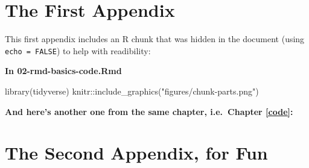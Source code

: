 \documentclass[a4paper, twoside]{templates/ociamthesis}
\newenvironment{Shaded}{\begin{snugshade}}{\end{snugshade}}
\newcommand{\FunctionTok}[1]{\textcolor[rgb]{0.00,0.00,0.00}{#1}}
\newcommand{\NormalTok}[1]{#1}
\newcommand{\SpecialCharTok}[1]{\textcolor[rgb]{0.00,0.00,0.00}{#1}}
\newcommand{\StringTok}[1]{\textcolor[rgb]{0.31,0.60,0.02}{#1}}
\renewenvironment{Shaded}
{
  \vspace{4pt}%
  \begin{snugshade}%
}{%
  \end{snugshade}%
  \vspace{4pt}%
}
\newcommand*{\bibtitle}{Works Cited}
\begin{document}
\startappendices

\hypertarget{the-first-appendix}{%
\chapter{The First Appendix}\label{the-first-appendix}}

This first appendix includes an R chunk that was hidden in the document (using \texttt{echo\ =\ FALSE}) to help with readibility:

\textbf{In 02-rmd-basics-code.Rmd}

\begin{Shaded}
\begin{Highlighting}[]
\FunctionTok{library}\NormalTok{(tidyverse)}
\NormalTok{knitr}\SpecialCharTok{::}\FunctionTok{include\_graphics}\NormalTok{(}\StringTok{"figures/chunk{-}parts.png"}\NormalTok{)}
\end{Highlighting}
\end{Shaded}

\textbf{And here's another one from the same chapter, i.e.~Chapter \ref{code}:}

\hypertarget{the-second-appendix-for-fun}{%
\chapter{The Second Appendix, for Fun}\label{the-second-appendix-for-fun}}




\setlength{\baselineskip}{0pt} %

{\renewcommand*\MakeUppercase[1]{#1}%
\printbibliography[heading=bibintoc,title={\bibtitle}]}
\end{document}
